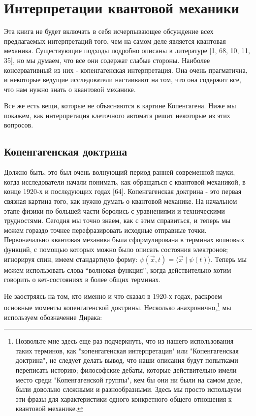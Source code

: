 \documentclass[main.tex]{subfiles}
\begin{document}
\section{Интерпретации квантовой механики}\label{ch3}

Эта книга не будет включать в себя исчерпывающее обсуждение всех предлагаемых интерпретаций того, чем на самом деле является квантовая механика. Существующие подходы подробно описаны в литературе [1, 68, 10, 11, 35], но мы думаем, что все они содержат слабые стороны. Наиболее консервативный из них - копенгагенская интерпретация. Она очень прагматична, и некоторые ведущие исследователи настаивают на том, что она содержит все, что нам нужно знать о квантовой механике.

Все же есть вещи, которые не объясняются в картине Копенгагена. Ниже мы покажем, как интерпретация клеточного автомата решит некоторые из этих вопросов.


\subsection{Копенгагенская доктрина}\label{ch3.1}

Должно быть, это был очень волнующий период ранней современной науки, когда исследователи начали понимать, как обращаться с квантовой механикой, в конце 1920-х и последующих годах [64]. Копенгагенская доктрина - это первая связная картина того, как нужно думать о квантовой механике. На начальном этапе физики по большей части боролись с уравнениями и техническими трудностями. Сегодня мы точно знаем, как с этим справиться, и теперь мы можем гораздо точнее перефразировать исходные отправные точки. Первоначально квантовая механика была сформулирована в терминах волновых функций, с помощью которых можно было описать состояния электронов; игнорируя спин, имеем стандартную форму: $\psi(\vec x, t) = \langle\vec x\mid\psi(t)\rangle$. Теперь мы можем использовать слова ``волновая функция'', когда действительно хотим говорить о кет-состояниях в более общих терминах.

Не заостряясь на том, кто именно и что сказал в 1920-х годах, раскроем основные моменты копенгагенской доктрины. Несколько анахронично,\footnote{Позвольте мне здесь еще раз подчеркнуть, что из нашего использования таких терминов, как "копенгагенская интерпретация" или "Копенгагенская доктрина", не следует делать вывод, что наши описания будут попытками переписать историю; философские дебаты, которые действительно имели место среди "Копенгагенской группы", кем бы они ни были на самом деле, были довольно сложными и разнообразными. Здесь мы просто используем эти фразы для характеристики одного конкретного общего отношения к квантовой механике.} мы используем обозначение Дирака:
\end{document}
